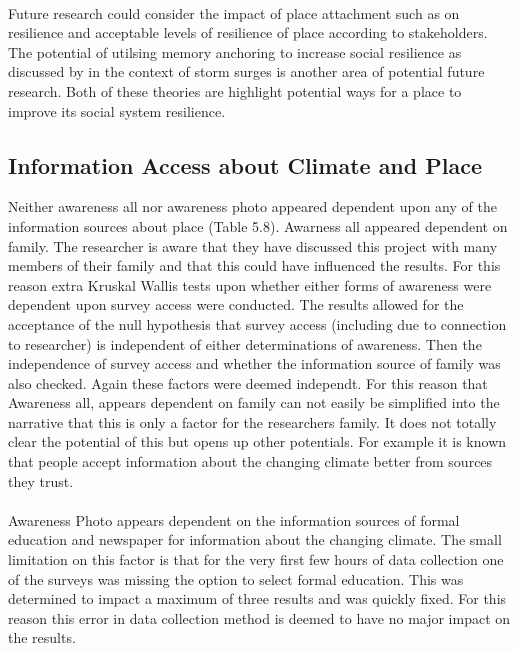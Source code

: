 \paragraph{}
Future research could consider the impact of place attachment such as \cite{ariccio_place_2021} on resilience and acceptable levels of resilience of place according to stakeholders. The potential of utilsing memory anchoring to increase social resilience as discussed by \cite{de_guttry_expiry_2022} in the context of storm surges is another area of potential future research. Both of these theories are highlight potential ways for a place to improve its social system resilience. 

\subsection{Information Access about Climate and Place}
Neither awareness all nor awareness photo appeared dependent upon any of the information sources about place  (Table 5.8). Awarness all appeared dependent on family. The researcher is aware that they have discussed this project with many members of their family and that this could have influenced the results. For this reason extra Kruskal Wallis tests upon whether either forms of awareness were dependent upon survey access were conducted. The results allowed for the acceptance of the null hypothesis that survey access (including due to connection to researcher) is independent of either determinations of awareness. Then the independence of survey access and whether the information source of family was also checked. Again these factors were deemed independt. For this reason that Awareness all, appears dependent on family can not easily be simplified into the narrative that this is only a factor for the researchers family. It does not totally clear the potential of this but opens up other potentials. For example it is known that people accept information about the changing climate better from sources they trust. 
\paragraph{}
Awareness Photo appears dependent on the information sources of formal education and newspaper for information about the changing climate. The small limitation on this factor is that for the very first few hours of data collection one of the surveys was missing the option to select formal education. This was determined to impact a maximum of three results and was quickly fixed. For this reason this error in data collection method is deemed to have no major impact on the results. 
